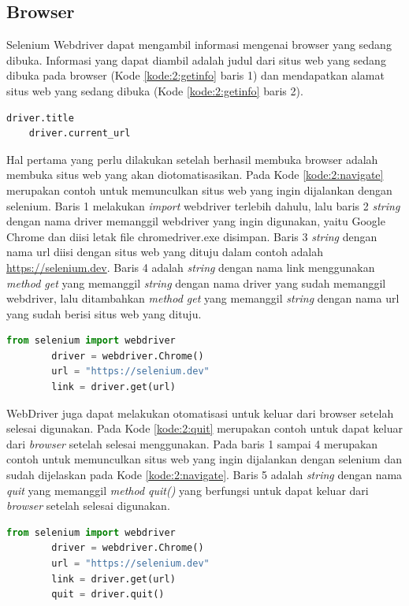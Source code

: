 \subsection{Browser}
Selenium Webdriver dapat mengambil informasi mengenai browser yang sedang dibuka. Informasi yang dapat diambil adalah judul dari situs web yang sedang dibuka pada browser (Kode \ref{kode:2:getinfo} baris 1) dan mendapatkan alamat situs web yang sedang dibuka (Kode \ref{kode:2:getinfo} baris 2). 
\begin{lstlisting}[language=python, caption=Contoh Potongan Kode \textit{Get Title} dan \textit{Get Current URL}, label=kode:2:getinfo]
	driver.title
	driver.current_url
\end{lstlisting}
Hal pertama yang perlu dilakukan setelah berhasil membuka browser adalah membuka situs web yang akan diotomatisasikan. Pada Kode \ref{kode:2:navigate} merupakan contoh untuk memunculkan situs web yang ingin dijalankan dengan selenium. Baris 1 melakukan \textit{import} webdriver terlebih dahulu, lalu baris 2 \textit{string} dengan nama driver memanggil webdriver yang ingin digunakan, yaitu Google Chrome dan diisi letak file chromedriver.exe disimpan. Baris 3 \textit{string} dengan nama url diisi dengan situs web yang dituju dalam contoh adalah \url{https://selenium.dev}. Baris 4 adalah \textit{string} dengan nama link menggunakan \textit{method get} yang memanggil \textit{string} dengan nama driver yang sudah memanggil webdriver, lalu ditambahkan \textit{method get} yang memanggil \textit{string} dengan nama url yang sudah berisi situs web yang dituju.
	\begin{lstlisting}[language=python, caption=Contoh kode Navigate to, label=kode:2:navigate]
		from selenium import webdriver
		driver = webdriver.Chrome()
		url = "https://selenium.dev"
		link = driver.get(url)
	\end{lstlisting}
WebDriver juga dapat melakukan otomatisasi untuk keluar dari browser setelah selesai digunakan. Pada Kode \ref{kode:2:quit} merupakan contoh untuk dapat keluar dari \textit{browser} setelah selesai menggunakan. Pada baris 1 sampai 4 merupakan contoh untuk memunculkan situs web yang ingin dijalankan dengan selenium dan sudah dijelaskan pada Kode \ref{kode:2:navigate}. Baris 5 adalah \textit{string} dengan nama \textit{quit} yang memanggil \textit{method quit()} yang berfungsi untuk dapat keluar dari \textit{browser} setelah selesai digunakan.
\newpage
	\begin{lstlisting}[language=python, caption=Contoh kode Get title, label=kode:2:quit]
		from selenium import webdriver
		driver = webdriver.Chrome()
		url = "https://selenium.dev"
		link = driver.get(url)
		quit = driver.quit()
	\end{lstlisting}

